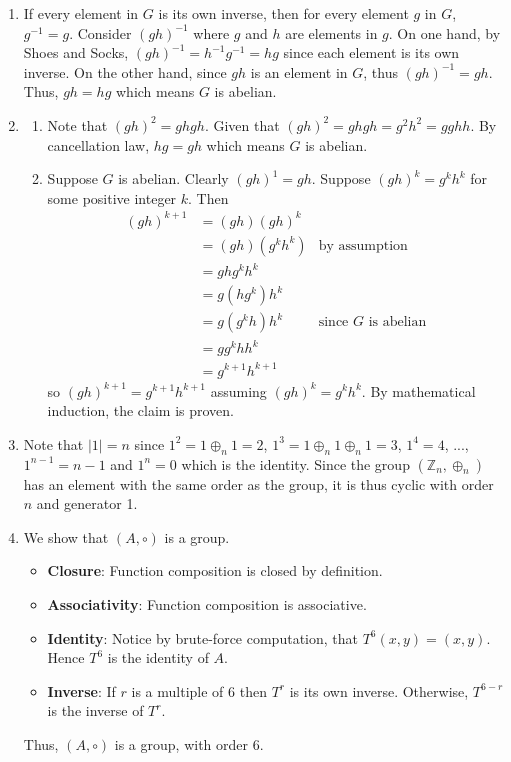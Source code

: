 \begin{enumerate}
    \item If every element in $G$ is its own inverse, then for every element $g$ in $G$, $g^{-1} = g$. Consider $(gh)^{-1}$ where $g$ and $h$ are elements in $g$. On one hand, by Shoes and Socks, $(gh)^{-1} = h^{-1}g^{-1} = hg$ since each element is its own inverse. On the other hand, since $gh$ is an element in $G$, thus $(gh)^{-1} = gh$. Thus, $gh = hg$ which means $G$ is abelian.

    \item \begin{enumerate}[label=(\alph*)]
        \item Note that $(gh)^2 = ghgh$. Given that $(gh)^2 = ghgh = g^2h^2 = gghh$. By cancellation law, $hg = gh$ which means $G$ is abelian.
        \item Suppose $G$ is abelian. Clearly $(gh)^1 = gh$. Suppose $(gh)^{k} = g^kh^k$ for some positive integer $k$. Then
        \begin{align*}
            (gh)^{k+1} &= (gh)(gh)^k\\
            &= (gh)(g^kh^k) & \text{by assumption}\\
            &= ghg^kh^k\\
            &= g(hg^k)h^k\\
            &= g(g^kh)h^k & \text{since } G \text{ is abelian}\\
            &= gg^khh^k\\
            &= g^{k+1}h^{k+1}
        \end{align*}
        so $(gh)^{k+1} = g^{k+1}h^{k+1}$ assuming $(gh)^k = g^kh^k$. By mathematical induction, the claim is proven.
    \end{enumerate}

    \item Note that $|1| = n$ since $1^2 = 1 \oplus_n 1 = 2$, $1^3 = 1 \oplus_n 1 \oplus_n 1 = 3$, $1^4 = 4$, ..., $1^{n-1} = n-1$ and $1^n = 0$ which is the identity. Since the group $(\mathbb{Z}_n, \oplus_n)$ has an element with the same order as the group, it is thus cyclic with order $n$ and generator 1.

    \item We show that $(A, \circ)$ is a group.
    \begin{itemize}
            \item \textbf{Closure}: Function composition is closed by definition.
            \item \textbf{Associativity}: Function composition is associative.
            \item \textbf{Identity}: Notice by brute-force computation, that $T^6(x, y) = (x, y)$. Hence $T^6$ is the identity of $A$.
            \item \textbf{Inverse}: If $r$ is a multiple of 6 then $T^r$ is its own inverse. Otherwise, $T^{6-r}$ is the inverse of $T^r$.
    \end{itemize}
    Thus, $(A, \circ)$ is a group, with order 6.
\end{enumerate}

